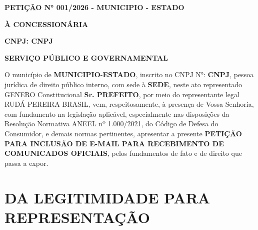 \documentclass[12pt,a4paper]{article}
\newcommand{\Municipio}{MUNICIPIO}
\newcommand{\Estado}{ESTADO}
\newcommand{\CNPJ}{CNPJ}
\newcommand{\Sede}{SEDE}
\newcommand{\GeneroCargo}{GENERO}
\newcommand{\PrefeitoNome}{Sr. PREFEITO}
\newcommand{\Concessionaria}{CONCESSIONÁRIA}
\newcommand{\CNPJCON}{CNPJ}
\begin{document}
\textbf{PETIÇÃO N° 001/2026 - \Municipio{} - \Estado{}}

\textbf{À \Concessionaria{}}

\textbf{CNPJ: \CNPJCON{}}

\textbf{SERVIÇO PÚBLICO E GOVERNAMENTAL}

\vspace{0,25cm}

O  município de \textbf{\Municipio{}}-\textbf{\Estado{}}, inscrito no CNPJ N°: \textbf{\CNPJ{}}, pessoa jurídica de direito público interno, com sede à \textbf{\Sede{}}, neste ato representado \GeneroCargo{} Constitucional \textbf{\PrefeitoNome{}}, por meio do representante legal RUDÁ PEREIRA BRASIL, vem, respeitosamente, à presença de Vossa Senhoria, com fundamento na legislação aplicável, especialmente nas disposições da Resolução Normativa ANEEL nº 1.000/2021, do Código de Defesa do Consumidor, e demais normas pertinentes, apresentar a presente \textbf{PETIÇÃO PARA INCLUSÃO DE E-MAIL PARA RECEBIMENTO DE COMUNICADOS OFICIAIS}, pelos fundamentos de fato e de direito que passa a expor.

\section{DA LEGITIMIDADE PARA REPRESENTAÇÃO}
\end{document}
